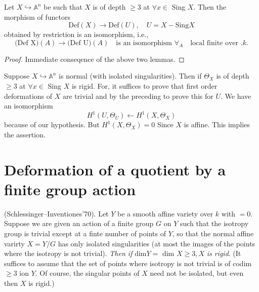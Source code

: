 {\begin{proposition}\label{part1-prop9.2}%
Let $X\hookrightarrow \mathbb{A}^{n}$ be such that $X$ is of depth $\geq 3$ at
$\forall x \in $ Sing $X$. Then the morphism of functors 
$$
\text{Def}(X)\to \text{Def}(U),\quad U=X-\text{Sing} X
$$
obtained by restriction is an isomorphism, i.e.,
$$
\text{(Def X)}(A)\to \text{(Def U)}(A)\quad \text{is an
isomorphism } \forall_A\quad\text{local finite over }. k. 
$$
\end{proposition}

\begin{proof}
Immediate conseqence of the above two lemmas.
\end{proof}

\begin{remark}\label{part1-rem9.2}%
Suppose $X\hookrightarrow \mathbb{A}^{n}$ is normal (with isolated
singularities). Then if $\Theta_X$ is of depth $\ge 3$ at $\forall
x\in$ Sing $X$ is rigid. For, it suffices to prove that first
order deformations of $X$ are trivial and by the preceding to prove
this for $U$. We have an isomorphism 
$$
H^{1}(U, \Theta_U)\leftarrow H^{1}(X, \Theta_X)
$$
because of our hypothesis. But $H^{1}(X, \Theta_X)=0$ Since $X$ is
affine. This implies the assertion. 
\end{remark}

\section{Deformation of a quotient by a finite group action}\label{part1-sec10}\pageoriginale

\begin{theorem}\label{part1-thm10.1}
(Schlessinger--Inventiones'70). Let $Y$ be a smooth affine variety
over $k$ with  $=0$. Suppose we are given an action of a
finite group $G$ on $Y$ such that the isotropy group is trivial except
at a finte number of points of $Y$, so that the normal affine varirty
$X=Y/G$ has only isolated singularities (at most the images of the
points where the isotropy is not trivial). {\em Then if} $\text{dim}
Y = \text{ dim } X \ge 3, X$ {\em is rigid}. (It suffices to assume that the set of
points where isotropy is not trivial is of codim$\ge 3$ ion $Y$. Of
course, the singular points of $X$ need not be isolated, but even then
$X$ is rigid.) 
\end{theorem}

}
